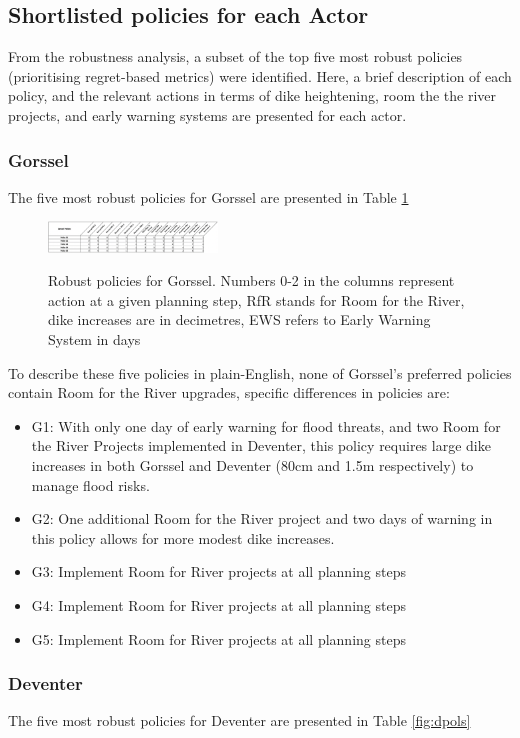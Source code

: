 \subsection{Shortlisted policies for each Actor}
From the robustness analysis, a subset of the top five most robust policies (prioritising regret-based metrics) were identified. Here, a brief description of each policy, and the relevant actions in terms of dike heightening, room the the river projects, and early warning systems are presented for each actor.
\subsubsection{Gorssel}
The five most robust policies for Gorssel are presented in Table \ref{fig:gpols}

\begin{figure}[h]
    \centering
    \caption{Robust policies for Gorssel. Numbers 0-2 in the columns represent action at a given planning step, RfR stands for Room for the River, dike increases are in decimetres, EWS refers to Early Warning System in days}
    \includegraphics[width=0.4\textwidth]{report/figures/gpols.png}
    \label{fig:gpols}
\end{figure}

To describe these five policies in plain-English, none of Gorssel's preferred policies contain Room for the River upgrades, specific differences in policies are:
\begin{itemize}
    \item G1: With only one day of early warning for flood threats, and two Room for the River Projects implemented in Deventer, this policy requires large dike increases in both Gorssel and Deventer (80cm and 1.5m respectively) to manage flood risks.
    \item G2: One additional Room for the River project and two days of warning in this policy allows for more modest dike increases.
    \item G3: Implement Room for River projects at all planning steps
    \item G4: Implement Room for River projects at all planning steps
    \item G5: Implement Room for River projects at all planning steps
\end{itemize}

\subsubsection{Deventer}
The five most robust policies for Deventer are presented in Table \ref{fig:dpols}

